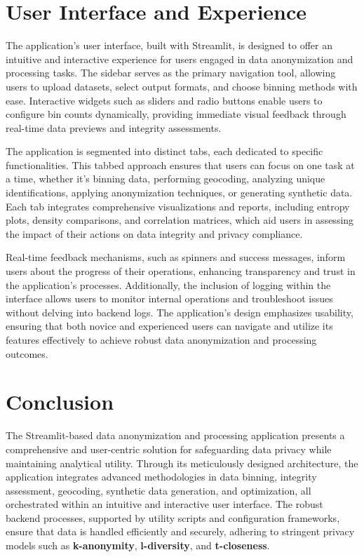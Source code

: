 \documentclass{article}
\begin{document}
\section*{User Interface and Experience}
The application's user interface, built with Streamlit, is designed to offer an intuitive and interactive experience for users engaged in data anonymization and processing tasks. The sidebar serves as the primary navigation tool, allowing users to upload datasets, select output formats, and choose binning methods with ease. Interactive widgets such as sliders and radio buttons enable users to configure bin counts dynamically, providing immediate visual feedback through real-time data previews and integrity assessments.

The application is segmented into distinct tabs, each dedicated to specific functionalities. This tabbed approach ensures that users can focus on one task at a time, whether it's binning data, performing geocoding, analyzing unique identifications, applying anonymization techniques, or generating synthetic data. Each tab integrates comprehensive visualizations and reports, including entropy plots, density comparisons, and correlation matrices, which aid users in assessing the impact of their actions on data integrity and privacy compliance.

Real-time feedback mechanisms, such as spinners and success messages, inform users about the progress of their operations, enhancing transparency and trust in the application's processes. Additionally, the inclusion of logging within the interface allows users to monitor internal operations and troubleshoot issues without delving into backend logs. The application's design emphasizes usability, ensuring that both novice and experienced users can navigate and utilize its features effectively to achieve robust data anonymization and processing outcomes.

\section*{Conclusion}
The Streamlit-based data anonymization and processing application presents a comprehensive and user-centric solution for safeguarding data privacy while maintaining analytical utility. Through its meticulously designed architecture, the application integrates advanced methodologies in data binning, integrity assessment, geocoding, synthetic data generation, and optimization, all orchestrated within an intuitive and interactive user interface. The robust backend processes, supported by utility scripts and configuration frameworks, ensure that data is handled efficiently and securely, adhering to stringent privacy models such as \textbf{k-anonymity}, \textbf{l-diversity}, and \textbf{t-closeness}.
\end{document}
